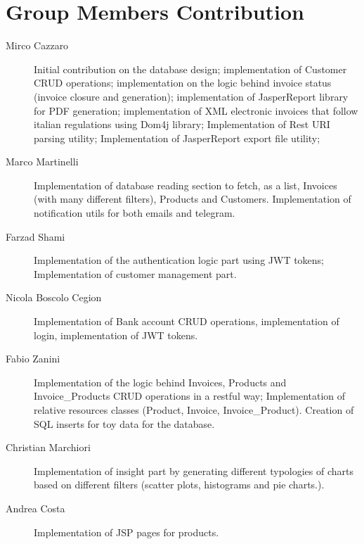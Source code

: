 \section{Group Members Contribution}


\begin{description}
	\item[Mirco Cazzaro] Initial contribution on the database design; implementation of Customer CRUD operations; implementation on the logic behind invoice status (invoice closure and generation); implementation of JasperReport library for PDF generation; implementation of XML electronic invoices that follow italian regulations using Dom4j library; Implementation of Rest URI parsing utility; Implementation of JasperReport export file utility;
	\item[Marco Martinelli] Implementation of database reading section to fetch, as a list, Invoices (with many different filters), Products and Customers. Implementation of notification utils for both emails and telegram. 
	\item[Farzad Shami] Implementation of the authentication logic part using JWT tokens; Implementation of customer management part.
	\item[Nicola Boscolo Cegion] Implementation of Bank account CRUD operations, implementation of login, implementation of JWT tokens.
	\item[Fabio Zanini] Implementation of the logic behind Invoices, Products and Invoice_Products CRUD operations in a restful way; Implementation of relative resources classes (Product, Invoice, Invoice_Product). Creation of SQL inserts for toy data for the database.
	\item[Christian Marchiori] Implementation of insight part by generating different typologies of charts based on different filters (scatter plots, histograms and pie charts.).
	\item[Andrea Costa] Implementation of JSP pages for products. 

\end{description}
